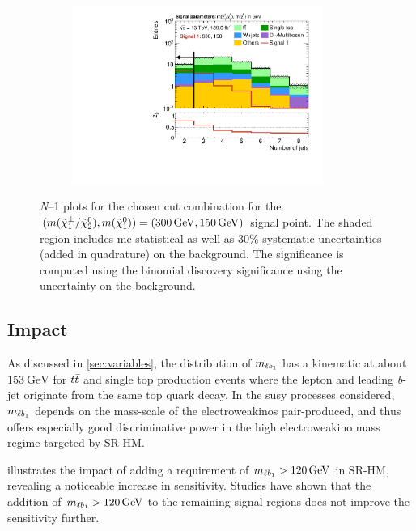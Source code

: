 \begin{figure}
\begin{subfigure}[b]{0.5\linewidth}
	\end{subfigure}\hfill
	\begin{subfigure}[b]{0.5\linewidth}
		\centering\includegraphics[width=0.9\textwidth]{N-1_cut_scan/n1_300_150/nJet30}
	\end{subfigure}

	\caption[\textit{N}--1 plots for the chosen cut combination for the (300, 150) signal point]{\textit{N}--1 plots for the chosen cut combination for the $(m(\charg/\neutr), m(\lsp)) = (\SI{300}{\GeV}, \SI{150}{\GeV})$ signal point. The shaded region includes \gls{mc} statistical as well as 30\% systematic uncertainties (added in quadrature) on the background. The significance is computed using the binomial discovery significance using the uncertainty on the background.}
	\label{fig:results_n1_300_150}
\end{figure}

\FloatBarrier

\subsection{Impact}


As discussed in \cref{sec:variables}, the distribution of $m_{\ell b_{1}}$ has a kinematic at about $\SI{153}{\GeV}$ for $t\bar{t}$ and single top production events where the lepton and leading \textit{b}-jet originate from the same top quark decay. In the \gls{susy} processes considered, $m_{\ell b_{1}}$ depends on the mass-scale of the electroweakinos pair-produced, and thus offers especially good discriminative power in the high electroweakino mass regime targeted by SR-HM.

 illustrates the impact of adding a requirement of $\mlb > \SI{120}{\GeV}$ in SR-HM, revealing a noticeable increase in sensitivity. Studies have shown that the addition of $\mlb > \SI{120}{\GeV}$ to the remaining signal regions does not improve the sensitivity further.

